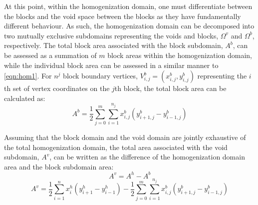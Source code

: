 At this point, within the homogenization domain, one must differentiate
between the blocks and the void space between the blocks as they have
fundamentally different behaviour. As such, the homogenization domain
can be decomposed into two mutually exclusive subdomains representing
the voids and blocks, $\Omega^{v}$ and $\Omega^{b}$, respectively.
The total block area associated with the block subdomain, $A^{b}$,
can be assessed as a summation of $m$ block areas within the homogenization
domain, while the individual block area can be assessed in a similar
manner to \ref{eqn:hom1}. For $n^{j}$ block boundary vertices, $V_{i,j}^{b}=(x_{i,j}^{b},y_{i,j}^{b})$
representing the $i$th set of vertex coordinates on the $j$th block,
the total block area can be calculated as: 
\begin{equation}
A^{b}=\dfrac{1}{2}\sum_{j=0}^{m}\sum_{i=1}^{n_{j}}x_{i,j}^{b}(y_{i+1,j}^{b}-y_{i-1,j}^{b})\label{eqn:hom2}
\end{equation}


Assuming that the block domain and the void domain are jointly exhaustive
of the total homogenization domain, the total area associated with
the void subdomain, $A^{v}$, can be written as the difference of
the homogenization domain area and the block subdomain area: 
\begin{equation}
A^{v}=A^{h}-A^{b}\label{eqn:hom3}
\end{equation}
\begin{equation}
A^{v}=\dfrac{1}{2}\sum_{i=1}^{n}x_{i}^{h}(y_{i+1}^{h}-y_{i-1}^{h})-\dfrac{1}{2}\sum_{j=0}^{m}\sum_{i=1}^{n_{j}}x_{i,j}^{b}(y_{i+1,j}^{b}-y_{i-1,j}^{b})\label{eqn:hom4}
\end{equation}

